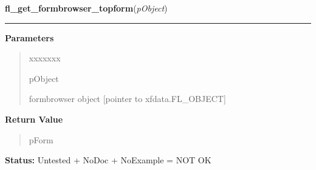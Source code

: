 \hspace{.8\funcindent}\begin{boxedminipage}{\funcwidth}

    \raggedright \textbf{fl\_get\_formbrowser\_topform}(\textit{pObject})

    \vspace{-1.5ex}

    \rule{\textwidth}{0.5\fboxrule}
\setlength{\parskip}{2ex}
\setlength{\parskip}{1ex}
      \textbf{Parameters}
      \vspace{-1ex}

      \begin{quote}
        \begin{Ventry}{xxxxxxx}

          \item[pObject]

          formbrowser object [pointer to xfdata.FL\_OBJECT]

        \end{Ventry}

      \end{quote}

      \textbf{Return Value}
    \vspace{-1ex}

      \begin{quote}
      pForm

      \end{quote}

\textbf{Status:} Untested + NoDoc + NoExample = NOT OK



    \end{boxedminipage}

    \label{xformslib:library:fl_set_formbrowser_topform}

    \vspace{0.5ex}

